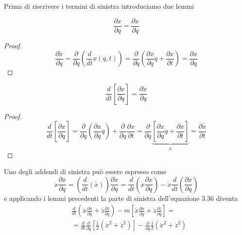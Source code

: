 Prima di riscrivere i termini di sinistra introduciamo due lemmi
\begin{lemma}
	\begin{equation}
		\frac{\partial x}{\partial q} = \frac{\partial \dot{x}}{\partial \dot{q}}
	\end{equation}
\end{lemma}
\begin{proof}
\begin{equation}
	\frac{\partial \dot{x}}{\partial \dot{q}} = \frac{\partial}{\partial \dot{q}}\left(\frac{d}{d t} x(q, t)\right)=\frac{\partial}{\partial \dot{q}}\left(\frac{\partial x}{\partial q} \dot{q}+\frac{\partial x}{\partial t}\right)=\frac{\partial x}{\partial q}
\end{equation}
	
\end{proof}
\begin{lemma}
	\begin{equation}
		 \frac{d}{d t}\left[\frac{\partial x}{\partial q}\right]=\frac{\partial \dot{x}}{\partial q}
	\end{equation}
\end{lemma}
\begin{proof}
	\begin{equation}
\frac{d}{d t}\left[\frac{\partial x}{\partial q}\right]=\frac{\partial}{\partial q}\left(\frac{\partial x}{\partial q} \dot{q}\right)+\frac{\partial}{\partial q} \frac{\partial x}{\partial t}=\frac{\partial}{\partial q} \underbrace{\left[\frac{\partial x}{\partial q} \dot{q}+\frac{\partial x}{\partial t}\right]}_{\dot{x}} = \frac{\partial \dot{x}}{\partial t}
\end{equation}
\end{proof}
\noindent Uno degli addendi di sinistra pu\`{o} essere espresso come 
\begin{equation}
\ddot{x} \frac{\partial x}{\partial q}=\left(\frac{d}{d t}(\dot{x})\right) \frac{\partial x}{\partial q}=\frac{d}{d t}\left(\dot{x} \frac{\partial x}{\partial q}\right)-\dot{x} \frac{d}{d t}\left(\frac{\partial x}{\partial q}\right)
\end{equation}
e applicando i lemmi precedenti la parte di sinistra dell'equazione 3.36 diventa 
\begin{equation}
\begin{aligned}
&  \frac{d}{d t}\left(\dot{x} \frac{\partial \dot{x}}{\partial \dot{q}}+\dot{z} \frac{\partial \dot{z}}{\partial \dot{q}}\right)-m\left[\dot{x} \frac{\partial \dot{x}}{\partial q}+\dot{z} \frac{\partial \dot{z}}{\partial q}\right]= \\[0.2in]
& =\frac{d}{d t} \frac{\partial}{\partial \dot{q}}\left[\frac{1}{2}\left(\dot{x}^2+\dot{z}^2\right)\right]-\frac{\partial}{\partial q} \frac{1}{2} \left(\dot{x}^2+\dot{z}^2\right)
\end{aligned}
\end{equation}

